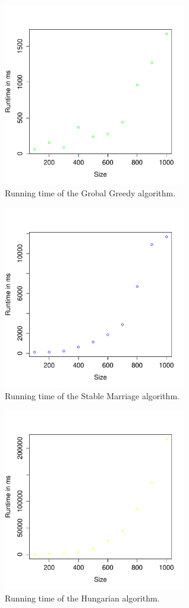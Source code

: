 \documentclass[a4paper,11pt]{article}
\begin{document}
\begin{figure}[ht!]
\centering 
\includegraphics[width=8cm]{../graphs/gg.pdf} 
\caption{Running time of the Grobal Greedy algorithm.}
\label{gg} 
\end{figure}

\begin{figure}[ht!]
\centering 
\includegraphics[width=8cm]{../graphs/sm.pdf} 
\caption{Running time of the Stable Marriage algorithm.}
\label{sm} 
\end{figure}

\begin{figure}[ht!]
\centering 
\includegraphics[width=8cm]{../graphs/hung.pdf} 
\caption{Running time of the Hungarian algorithm.}
\label{hung} 
\end{figure}
\end{document}
